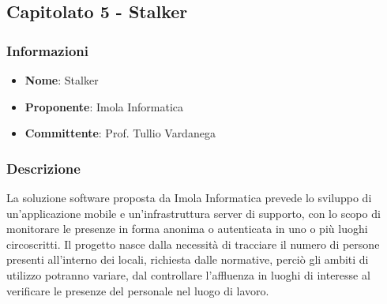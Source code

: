 \subsection{Capitolato 5 - Stalker}

\subsubsection{Informazioni}
\begin{itemize}
	\item \textbf{Nome}: Stalker
	\item \textbf{Proponente}: Imola Informatica
	\item \textbf{Committente}: Prof. Tullio Vardanega
\end{itemize}

\subsubsection{Descrizione}
La soluzione software proposta da Imola Informatica prevede lo sviluppo di un'applicazione mobile e un'infrastruttura server di supporto, con lo scopo di monitorare le presenze in forma anonima o autenticata in uno o più luoghi circoscritti.
Il progetto nasce dalla necessità di tracciare il numero di persone presenti all'interno dei locali, richiesta dalle normative, perciò gli ambiti di utilizzo potranno variare, dal controllare l'affluenza in luoghi di interesse al verificare le presenze del personale nel luogo di lavoro.

